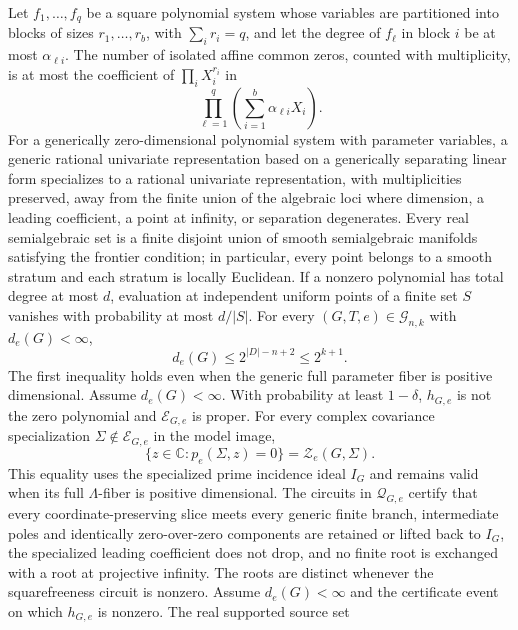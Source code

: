 Let \(f_1,\ldots,f_q\) be a square polynomial system whose variables are partitioned into blocks of sizes \(r_1,\ldots,r_b\), with \(\sum_i r_i=q\), and let the degree of \(f_\ell\) in block \(i\) be at most \(\alpha_{\ell i}\). The number of isolated affine common zeros, counted with multiplicity, is at most the coefficient of \(\prod_i X_i^{r_i}\) in
\[
\prod_{\ell=1}^{q}\left(\sum_{i=1}^{b}\alpha_{\ell i}X_i\right).
\]
For a generically zero-dimensional polynomial system with parameter variables, a generic rational univariate representation based on a generically separating linear form specializes to a rational univariate representation, with multiplicities preserved, away from the finite union of the algebraic loci where dimension, a leading coefficient, a point at infinity, or separation degenerates.
Every real semialgebraic set is a finite disjoint union of smooth semialgebraic manifolds satisfying the frontier condition; in particular, every point belongs to a smooth stratum and each stratum is locally Euclidean.
If a nonzero polynomial has total degree at most \(d\), evaluation at independent uniform points of a finite set \(S\) vanishes with probability at most \(d/|S|\).
For every \((G,T,e)\in\mathcal G_{n,k}\) with \(d_e(G)<\infty\),
\[
d_e(G)\le 2^{|D|-n+2}\le2^{k+1}.
\]
The first inequality holds even when the generic full parameter fiber is positive dimensional.
Assume \(d_e(G)<\infty\). With probability at least \(1-\delta\), \(h_{G,e}\) is not the zero polynomial and \(\mathcal E_{G,e}\) is proper. For every complex covariance specialization \(\Sigma\notin\mathcal E_{G,e}\) in the model image,
\[
\{z\in\mathbb C:p_e(\Sigma,z)=0\}=\mathcal Z_e(G,\Sigma).
\]
This equality uses the specialized prime incidence ideal \(I_G\) and remains valid when its full \(\Lambda\)-fiber is positive dimensional. The circuits in \(\mathcal Q_{G,e}\) certify that every coordinate-preserving slice meets every generic finite branch, intermediate poles and identically zero-over-zero components are retained or lifted back to \(I_G\), the specialized leading coefficient does not drop, and no finite root is exchanged with a root at projective infinity. The roots are distinct whenever the squarefreeness circuit is nonzero.
Assume \(d_e(G)<\infty\) and the certificate event on which \(h_{G,e}\) is nonzero. The real supported source set
